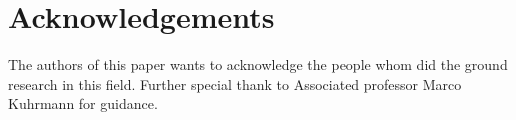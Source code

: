 \documentclass{sig-alternate}
\begin{document}
\section{Acknowledgements}
The authors of this paper wants to acknowledge the people whom did the ground research in this field. Further special thank to Associated professor Marco Kuhrmann for guidance. 
%

%
%
\end{document}

